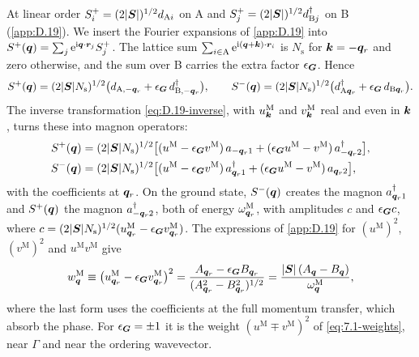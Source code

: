 At linear order $S^+_i = (2|\bm{S}|)^{1/2}d_{\mathrm{A}i}$ on A and $S^+_j = (2|\bm{S}|)^{1/2}d^\dagger_{\mathrm{B}j}$ on B (\cref{app:D.19}). We insert the Fourier expansions of \cref{app:D.19} into $S^+(\bm{q}) = \sum_j\mathrm{e}^{\mathrm{i}\bm{q}\cdot\bm{r}_j}S^+_j$. The lattice sum $\sum_{i\in\mathrm{A}}\mathrm{e}^{\mathrm{i}(\bm{q}+\bm{k})\cdot\bm{r}_i}$ is $N_{\mathrm{s}}$ for $\bm{k} = -\bm{q}_r$ and zero otherwise, and the sum over B carries the extra factor $\epsilon_{\bm{G}}$. Hence
\begin{equation*}
  S^+(\bm{q}) = (2|\bm{S}|N_{\mathrm{s}})^{1/2}\bigl(d_{\mathrm{A},-\bm{q}_r} + \epsilon_{\bm{G}}\,d^\dagger_{\mathrm{B},-\bm{q}_r}\bigr), \qquad
  S^-(\bm{q}) = (2|\bm{S}|N_{\mathrm{s}})^{1/2}\bigl(d^\dagger_{\mathrm{A}\bm{q}_r} + \epsilon_{\bm{G}}\,d_{\mathrm{B}\bm{q}_r}\bigr) .
\end{equation*}
The inverse transformation \cref{eq:D.19-inverse}, with $u^{\mathrm{M}}_{\bm{k}}$ and $v^{\mathrm{M}}_{\bm{k}}$ real and even in $\bm{k}$, turns these into magnon operators:
\begin{equation*}
  \begin{aligned}
  S^+(\bm{q}) &= (2|\bm{S}|N_{\mathrm{s}})^{1/2}\bigl[(u^{\mathrm{M}} - \epsilon_{\bm{G}}v^{\mathrm{M}})\,a_{-\bm{q}_r1} + (\epsilon_{\bm{G}}u^{\mathrm{M}} - v^{\mathrm{M}})\,a^\dagger_{-\bm{q}_r2}\bigr] , \\
  S^-(\bm{q}) &= (2|\bm{S}|N_{\mathrm{s}})^{1/2}\bigl[(u^{\mathrm{M}} - \epsilon_{\bm{G}}v^{\mathrm{M}})\,a^\dagger_{\bm{q}_r1} + (\epsilon_{\bm{G}}u^{\mathrm{M}} - v^{\mathrm{M}})\,a_{\bm{q}_r2}\bigr] ,
  \end{aligned}
\end{equation*}
with the coefficients at $\bm{q}_r$. On the ground state, $S^-(\bm{q})$ creates the magnon $a^\dagger_{\bm{q}_r1}$ and $S^+(\bm{q})$ the magnon $a^\dagger_{-\bm{q}_r2}$, both of energy $\omega^{\mathrm{M}}_{\bm{q}_r}$, with amplitudes $c$ and $\epsilon_{\bm{G}}c$, where $c = (2|\bm{S}|N_{\mathrm{s}})^{1/2}(u^{\mathrm{M}}_{\bm{q}_r} - \epsilon_{\bm{G}}v^{\mathrm{M}}_{\bm{q}_r})$. The expressions of \cref{app:D.19} for $(u^{\mathrm{M}})^2$, $(v^{\mathrm{M}})^2$ and $u^{\mathrm{M}}v^{\mathrm{M}}$ give
\begin{equation}
  w^{\mathrm{M}}_{\bm{q}} \equiv \bigl(u^{\mathrm{M}}_{\bm{q}_r} - \epsilon_{\bm{G}}v^{\mathrm{M}}_{\bm{q}_r}\bigr)^2
  = \frac{A_{\bm{q}_r} - \epsilon_{\bm{G}}B_{\bm{q}_r}}{(A_{\bm{q}_r}^2 - B_{\bm{q}_r}^2)^{1/2}}
  = \frac{|\bm{S}|\,(A_{\bm{q}} - B_{\bm{q}})}{\omega^{\mathrm{M}}_{\bm{q}}} ,
  \label{eq:D.38-weight}
\end{equation}
where the last form uses the coefficients at the full momentum transfer, which absorb the phase. For $\epsilon_{\bm{G}} = \pm1$ it is the weight $(u^{\mathrm{M}} \mp v^{\mathrm{M}})^2$ of \cref{eq:7.1-weights}, near $\Gamma$ and near the ordering wavevector.

